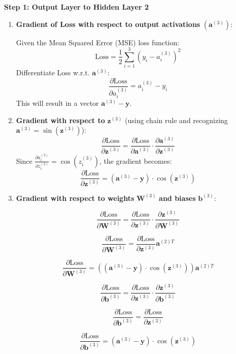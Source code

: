 \documentclass{ioereport}
\begin{document}
\textbf{Step 1: Output Layer to Hidden Layer 2}
\begin{enumerate}[label=\textbf{\roman*.}]
  \item \textbf{Gradient of Loss with respect to output activations} $(\mathbf{a}^{(3)})$:
  
  Given the Mean Squared Error (MSE) loss function:
  \[
  \text{Loss} = \frac{1}{2} \sum_{i=1}^{3} (y_i - a^{(3)}_i)^2
  \]
  Differentiate Loss w.r.t. $\mathbf{a}^{(3)}$:
  \[
  \frac{\partial \text{Loss}}{\partial a^{(3)}_i} = a^{(3)}_i - y_i
  \]
  This will result in a vector $\mathbf{a}^{(3)} - \mathbf{y}$.

  \item \textbf{Gradient with respect to} $\mathbf{z}^{(3)}$ (using chain rule and recognizing $\mathbf{a}^{(3)} = \sin(\mathbf{z}^{(3)})$):
  \[
  \frac{\partial \text{Loss}}{\partial \mathbf{z}^{(3)}} = \frac{\partial \text{Loss}}{\partial \mathbf{a}^{(3)}} \cdot \frac{\partial \mathbf{a}^{(3)}}{\partial \mathbf{z}^{(3)}}
  \]
  Since $\frac{\partial a^{(3)}_i}{\partial z^{(3)}_i} = \cos(z^{(3)}_i)$, the gradient becomes:
  \[
  \frac{\partial \text{Loss}}{\partial \mathbf{z}^{(3)}} = (\mathbf{a}^{(3)} - \mathbf{y}) \cdot \cos(\mathbf{z}^{(3)})
  \]

  \item \textbf{Gradient with respect to weights} $\mathbf{W}^{(3)}$ \textbf{and biases} $\mathbf{b}^{(3)}$:
  
  \[
  \frac{\partial \text{Loss}}{\partial \mathbf{W}^{(3)}} = \frac{\partial \text{Loss}}{\partial \mathbf{z}^{(3)}} \cdot \frac{\partial \mathbf{z}^{(3)}}{\partial \mathbf{W}^{(3)}}
  \]
  
  \[
  \frac{\partial \text{Loss}}{\partial \mathbf{W}^{(3)}} = \frac{\partial \text{Loss}}{\partial \mathbf{z}^{(3)}} \mathbf{a}^{(2)T}
  \]
  
  \[
  \frac{\partial \text{Loss}}{\partial \mathbf{W}^{(3)}} = \left((\mathbf{a}^{(3)} - \mathbf{y}) \cdot \cos(\mathbf{z}^{(3)})\right) \mathbf{a}^{(2)T}
  \]


  \[
  \frac{\partial \text{Loss}}{\partial \mathbf{b}^{(3)}} = \frac{\partial \text{Loss}}{\partial \mathbf{z}^{(3)}} \cdot \frac{\partial \mathbf{z}^{(3)}}{\partial \mathbf{b}^{(3)}}
  \]

  \[
  \frac{\partial \text{Loss}}{\partial \mathbf{b}^{(3)}} = \frac{\partial \text{Loss}}{\partial \mathbf{z}^{(3)}}
  \]

  \[
  \frac{\partial \text{Loss}}{\partial \mathbf{b}^{(3)}} = (\mathbf{a}^{(3)} - \mathbf{y}) \cdot \cos(\mathbf{z}^{(3)})
  \]
  
\end{enumerate}
\end{document}
